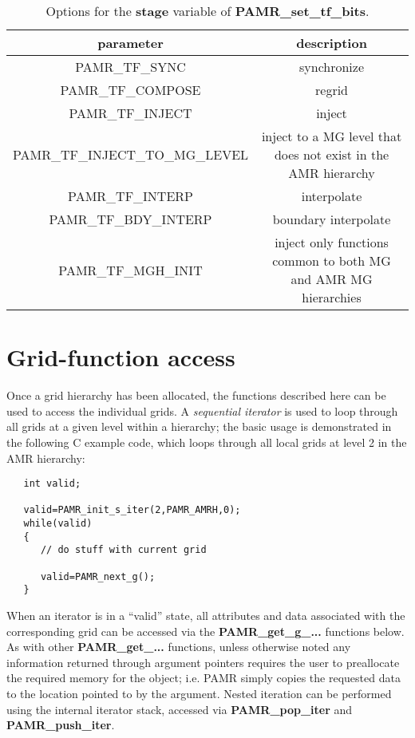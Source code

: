 \documentclass[aps,amssymb,unsortedaddress,nofootinbib]{revtex4}
\begin{document}
\begin{table}
\begin{center}
\begin{tabular}[t]{| c || c |}
\hline
parameter & description \\
\hline
\hline
PAMR\_TF\_SYNC& synchronize \\
PAMR\_TF\_COMPOSE& regrid \\
PAMR\_TF\_INJECT& inject \\
PAMR\_TF\_INJECT\_TO\_MG\_LEVEL& inject to a MG level that does not exist in the AMR hierarchy\\
PAMR\_TF\_INTERP& interpolate \\
PAMR\_TF\_BDY\_INTERP& boundary interpolate\\
PAMR\_TF\_MGH\_INIT& inject only functions common to both MG and AMR MG hierarchies\\
\hline
\end{tabular}
\end{center}
\caption
{ Options for the {\bf stage} variable of {\bf PAMR\_set\_tf\_bits}.
\label{tab_stage_ops}}
\end{table}


\section{Grid-function access}

Once a grid hierarchy has been allocated, the functions described here can be used
to access the individual grids. A {\em sequential iterator} is used to loop
through all grids at a given level within a hierarchy; the basic usage is
demonstrated in the following C example code, which loops through all local grids
at level 2 in the AMR hierarchy:
\begin{verbatim}
   int valid;

   valid=PAMR_init_s_iter(2,PAMR_AMRH,0);
   while(valid)
   {
      // do stuff with current grid  
     
      valid=PAMR_next_g();
   }
\end{verbatim}
When an iterator is in a ``valid'' state, all attributes and data associated with the
corresponding grid can be accessed via the {\bf PAMR\_get\_g\_...} functions below.
As with other {\bf PAMR\_get\_...} functions, unless otherwise noted any
information returned through argument pointers requires the user to 
preallocate the required memory for the object; i.e. PAMR simply copies the
requested data to the location pointed to by the argument.
Nested iteration can be performed using the internal iterator stack, accessed
via {\bf PAMR\_pop\_iter} and {\bf PAMR\_push\_iter}.
\end{document}
